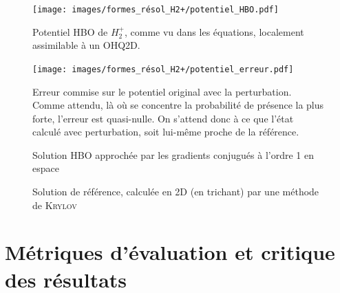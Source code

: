 \documentclass[svgnames,dvipsnames,a4paper,10pt,french]{report}
\begin{document}
\begin{figure}[H]
    \centering
    \texttt{[image: images/formes\_résol\_H2+/potentiel\_HBO.pdf]}
    \caption{Potentiel HBO de $H_2^+$, comme vu dans les équations, localement assimilable à un OHQ2D.}
    \label{fig:pot_hbo_h2plus}
\end{figure}

\begin{figure}[H]
    \centering
    \texttt{[image: images/formes\_résol\_H2+/potentiel\_erreur.pdf]}
    \caption[Erreur commise sur le potentiel original]{Erreur commise sur le potentiel original avec la perturbation. Comme attendu, là où se concentre la probabilité de présence la plus forte, l'erreur est quasi-nulle. On s'attend donc à ce que l'état calculé avec perturbation, soit lui-même proche de la référence.}
    \label{fig:err_hbo_h2plus}
\end{figure}



\begin{figure}[H]
    \centering
    \caption{Solution HBO approchée par les gradients conjugués à l'ordre 1 en espace}%
    \label{fig:sol_Psi_pert}%
\end{figure}



\begin{figure}[H]
    \centering
    \caption{Solution de référence, calculée en 2D (en trichant) par une méthode de \textsc{Krylov}}%
    \label{fig:sol_Psi_true}%
\end{figure}




\section{Métriques d'évaluation et critique des résultats}
\end{document}
